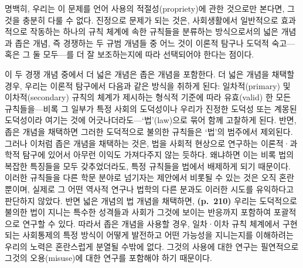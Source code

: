 명백히, 우리는 이 문제를 언어 사용의 적절성(propriety)에 관한 것으로만
본다면, 그것을 충분히 다룰 수 없다. 진정으로 문제가 되는 것은,
사회생활에서 일반적으로 효과적으로 작동하는 하나의 규칙 체계에 속한
규칙들을 분류하는 방식으로서의 넓은 개념과 좁은 개념, 즉 경쟁하는 두
규범 개념들 중 어느 것이 이론적 탐구나 도덕적 숙고---혹은 그 둘
모두---를 더 잘 보조하는지에 따라 선택되어야 한다는 점이다.

이 두 경쟁 개념 중에서 더 넓은 개념은 좁은 개념을 포함한다. 더 넓은
개념을 채택할 경우, 우리는 이론적 탐구에서 다음과 같은 방식을 취하게
된다: 일차적(primary) 및 이차적(secondary) 규칙의 체계가 제시하는 형식적
기준에 따라 유효(valid) 한 모든 규칙들을---비록 그 일부가 특정 사회의
도덕성이나 우리가 진정한 도덕성 또는 계몽된 도덕성이라 여기는 것에
어긋나더라도---`법'(law)으로 묶어 함께 고찰하게 된다. 반면, 좁은 개념을
채택하면 그러한 도덕적으로 불의한 규칙들은 `법'의 범주에서 제외된다.
그러나 이처럼 좁은 개념을 채택하는 것은, 법을 사회적 현상으로 연구하는
이론적·과학적 탐구에 있어서 아무런 이익도 가져다주지 않는 듯하다.
왜냐하면 이는 비록 법의 복잡한 특징들을 모두 갖추었더라도, 특정 규칙들을
법에서 배제하게 되기 때문이다. 이러한 규칙들을 다른 학문 분야로 넘기자는
제안에서 비롯될 수 있는 것은 오직 혼란뿐이며, 실제로 그 어떤 역사적
연구나 법학의 다른 분과도 이러한 시도를 유익하다고 판단하지 않았다. 반면
넓은 개념의 법 개념을 채택하면, \textbf{(p.~210)} 우리는 도덕적으로
불의한 법이 지니는 특수한 성격들과 사회가 그것에 보이는 반응까지
포함하여 포괄적으로 연구할 수 있다. 따라서 좁은 개념을 사용할 경우,
일차·이차 규칙 체계에서 구현되는 사회통제의 특정 방식이 어떻게 발전하고
어떤 가능성을 지니는지를 이해하려는 우리의 노력은 혼란스럽게 분열될
수밖에 없다. 그것의 사용에 대한 연구는 필연적으로 그것의 오용(misuse)에
대한 연구를 포함해야 하기 때문이다.

